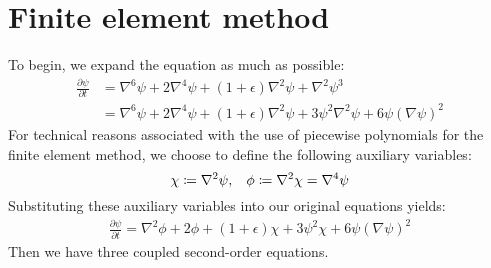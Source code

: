 \documentclass[reqno]{article}
\begin{document}
\section{Finite element method}
To begin, we expand the equation as much as possible:
\begin{equation}
    \begin{split}
        \frac{\partial \psi}{\partial t}
        &=
        \nabla^6 \psi
        + 2 \nabla^4 \psi
        + \left(1 + \epsilon \right) \nabla^2 \psi
        + \nabla^2 \psi^3 \\
        &=
        \nabla^6 \psi
        + 2 \nabla^4 \psi
        + \left(1 + \epsilon \right) \nabla^2 \psi
        + 3 \psi^2 \nabla^2 \psi
        + 6 \psi \left( \nabla \psi \right)^2
    \end{split}
\end{equation}
For technical reasons associated with the use of piecewise polynomials for the finite element method, we choose to define the following auxiliary variables:
\begin{equation}
    \chi \coloneqq \nabla^2 \psi, \hspace{0.3cm}
    \phi \coloneqq \nabla^2 \chi = \nabla^4 \psi
\end{equation}
Substituting these auxiliary variables into our original equations yields:
\begin{equation}
    \begin{split}
        \frac{\partial \psi}{\partial t}
        =
        \nabla^2 \phi
        + 2 \phi
        + \left(1 + \epsilon \right) \chi
        + 3 \psi^2 \chi
        + 6 \psi \left(\nabla \psi \right)^2
    \end{split}
\end{equation}
Then we have three coupled second-order equations.
\end{document}
